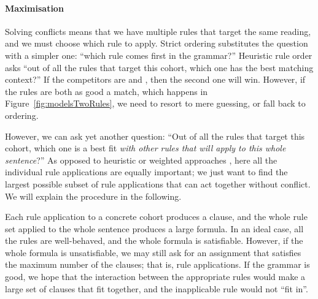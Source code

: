 \paragraph{Maximisation} 

Solving conflicts means that we have multiple rules that target the same reading, and we must choose which rule to apply.
Strict ordering substitutes the question with a simpler one: ``which rule comes first in the grammar?''
Heuristic rule order asks ``out of all the rules that target this cohort, which one has the best matching context?''
If the competitors are  and , then the second one will win. However, if the rules are both as good a match, which happens in Figure~\ref{fig:modelsTwoRules}, we need to resort to mere guessing, or fall back to ordering.

However, we can ask yet another question: ``Out of all the rules that target this cohort, which one is a best fit \emph{with other rules that will apply to this whole sentence}?'' 
As opposed to heuristic or weighted approaches \cite{voutilainen1994designing,oflazer97votingconstraints}, here all the individual rule applications are 
equally important; we just want to find the largest possible subset of rule applications that can act together without conflict.
We will explain the procedure in the following.


Each rule application to a concrete cohort produces a clause,
and the whole rule set applied to the whole sentence produces 
a large formula. In an ideal case, all the rules are well-behaved, 
and the whole formula is satisfiable. However, if the whole formula 
is unsatisfiable, we may still ask for an assignment that satisfies 
the maximum number of the clauses; that is, rule applications. 
If the grammar is good, we hope that the interaction between 
the appropriate rules would make a large set of clauses that 
fit together, and the inapplicable rule would not ``fit in''.

